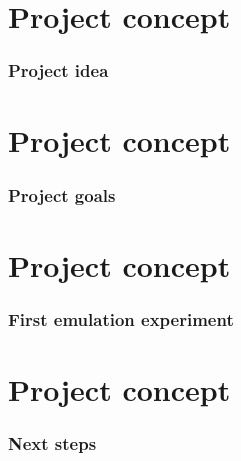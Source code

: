 \documentclass[xcolor=dvipsnames, USenglish]{beamer}  %
\begin{document}
\section{Project concept}
  \begin{frame}
    \frametitle{Project idea}
  \end{frame}


\section{Project concept}
  \begin{frame}
    \frametitle{Project goals}
  
  \end{frame}
  

\section{Project concept}
  \begin{frame}
    \frametitle{First emulation experiment}
  
  \end{frame}
  

\section{Project concept}
  \begin{frame}
    \frametitle{Next steps}
  
  \end{frame}
\end{document}
